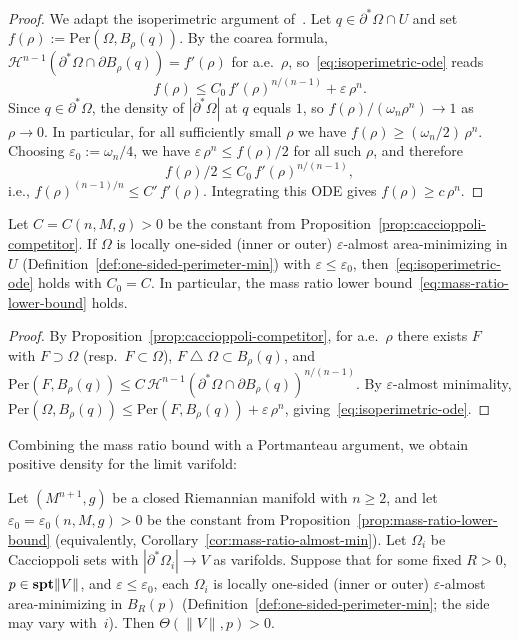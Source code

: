 \begin{proof}
We adapt the isoperimetric argument of~\cite[\S0.3, p.~16]{Lin85}.
Let $q \in \partial^*\Omega \cap U$ and set $f(\rho) := \mathrm{Per}(\Omega, B_\rho(q))$.
By the coarea formula, $\mathcal{H}^{n-1}(\partial^*\Omega \cap \partial B_\rho(q)) = f'(\rho)$ for a.e.\ $\rho$, so~\eqref{eq:isoperimetric-ode} reads
\[
    f(\rho) \leq C_0\,f'(\rho)^{n/(n-1)} + \varepsilon\,\rho^n.
\]
Since $q \in \partial^*\Omega$, the density of $|\partial^*\Omega|$ at $q$ equals $1$, so $f(\rho)/(\omega_n\rho^n) \to 1$ as $\rho \to 0$.
In particular, for all sufficiently small $\rho$ we have $f(\rho) \geq (\omega_n/2)\,\rho^n$.
Choosing $\varepsilon_0 := \omega_n/4$, we have $\varepsilon\,\rho^n \leq f(\rho)/2$ for all such $\rho$, and therefore
\[
    f(\rho)/2 \leq C_0\,f'(\rho)^{n/(n-1)},
\]
i.e., $f(\rho)^{(n-1)/n} \leq C'\,f'(\rho)$.
Integrating this ODE gives $f(\rho) \geq c\,\rho^n$.
\end{proof}

\begin{corollary}\label{cor:mass-ratio-almost-min}
Let $C = C(n, M, g) > 0$ be the constant from Proposition~\ref{prop:caccioppoli-competitor}.
If $\Omega$ is locally one-sided (inner or outer) $\varepsilon$-almost area-minimizing in $U$ (Definition~\ref{def:one-sided-perimeter-min}) with $\varepsilon \leq \varepsilon_0$, then~\eqref{eq:isoperimetric-ode} holds with $C_0 = C$. In particular, the mass ratio lower bound~\eqref{eq:mass-ratio-lower-bound} holds.
\end{corollary}

\begin{proof}
By Proposition~\ref{prop:caccioppoli-competitor}, for a.e.\ $\rho$ there exists $F$ with $F \supset \Omega$ (resp.\ $F \subset \Omega$), $F \mathbin{\triangle} \Omega \subset B_\rho(q)$, and $\mathrm{Per}(F, B_\rho(q)) \leq C\,\mathcal{H}^{n-1}(\partial^*\Omega \cap \partial B_\rho(q))^{n/(n-1)}$.
By $\varepsilon$-almost minimality, $\mathrm{Per}(\Omega, B_\rho(q)) \leq \mathrm{Per}(F, B_\rho(q)) + \varepsilon\,\rho^n$, giving~\eqref{eq:isoperimetric-ode}.
\end{proof}

Combining the mass ratio bound with a Portmanteau argument, we obtain positive density for the limit varifold:

\begin{lemma}\label{lem:one-sided-density}
Let $(M^{n+1}, g)$ be a closed Riemannian manifold with $n \geq 2$, and let $\varepsilon_0 = \varepsilon_0(n, M, g) > 0$ be the constant from Proposition~\ref{prop:mass-ratio-lower-bound} (equivalently, Corollary~\ref{cor:mass-ratio-almost-min}).
Let $\Omega_i$ be Caccioppoli sets with $|\partial^*\Omega_i| \to V$ as varifolds.
Suppose that for some fixed $R > 0$, $p \in \mathbf{spt}\|V\|$, and $\varepsilon \leq \varepsilon_0$, each $\Omega_i$ is locally one-sided (inner or outer) $\varepsilon$-almost area-minimizing in $B_R(p)$ (Definition~\ref{def:one-sided-perimeter-min}; the side may vary with~$i$).
Then $\Theta(\|V\|, p) > 0$.
\end{lemma}

